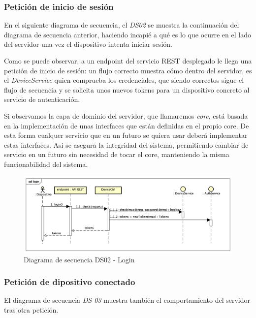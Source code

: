 \subsubsection{Petición de inicio de sesión}

En el siguiente diagrama de secuencia, el \textit{DS02} se muestra la continuación del diagrama de secuencia anterior, haciendo incapié a qué es lo que ocurre en el lado del servidor una vez el dispositivo intenta iniciar sesión.

Como se puede observar, a un endpoint del servicio REST desplegado le llega una petición de inicio de sesión: un flujo correcto muestra cómo dentro del servidor, es el \textit{DeviceService} quien comprueba los credenciales, que siendo correctos sigue el flujo de secuencia y se solicita unos nuevos tokens para un dispositivo concreto al servicio de autenticación.

Si observamos la capa de dominio del servidor, que llamaremos \textit{core}, está basada en la implementación de unas interfaces que están definidas en el propio core. De esta forma cualquer servicio que en un futuro se quiera usar deberá implementar estas interfaces. Así se asegura la integridad del sistema, permitiendo cambiar de servicio en un futuro sin necesidad de tocar el core, manteniendo la misma funcionabilidad del sistema.

\begin{figure}[H]
    \centering
    \includegraphics[width=14cm]{./img/sequence/diagram/login.png}
    \caption{Diagrama de secuencia DS02 - Login}
    \label{fig:seq.login}
\end{figure}

\subsubsection{Petición de dipositivo conectado}

El diagrama de secuencia \textit{DS 03} muestra también el comportamiento del servidor tras otra petición.

